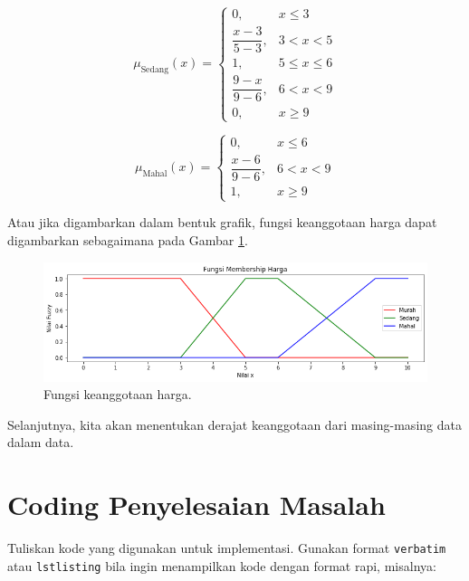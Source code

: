 \documentclass[12pt,a4paper]{article}
\theoremstyle{remark}
\begin{document}
\[
    \mu_{\text{Sedang}}(x) =
    \begin{cases}
        0,                    & x \leq 3        \\
        \dfrac{x - 3}{5 - 3}, & 3 < x < 5       \\
        1,                    & 5 \leq x \leq 6 \\
        \dfrac{9 - x}{9 - 6}, & 6 < x < 9       \\
        0,                    & x \geq 9
    \end{cases}
\]

\[
    \mu_{\text{Mahal}}(x) =
    \begin{cases}
        0,                    & x \leq 6  \\
        \dfrac{x - 6}{9 - 6}, & 6 < x < 9 \\
        1,                    & x \geq 9
    \end{cases}
\]

Atau jika digambarkan dalam bentuk grafik, fungsi keanggotaan harga dapat digambarkan sebagaimana pada Gambar \ref{fig:member_harga}.
\begin{figure}[H]
    \centering
    \includegraphics[width=1\linewidth]{images/member_harga.png}
    \caption{Fungsi keanggotaan harga.}
    \label{fig:member_harga}
\end{figure}

Selanjutnya, kita akan menentukan derajat keanggotaan dari masing-masing data dalam data.





\section{Coding Penyelesaian Masalah}
Tuliskan kode yang digunakan untuk implementasi.
Gunakan format \texttt{verbatim} atau \texttt{lstlisting} bila ingin menampilkan kode dengan format rapi, misalnya:
\end{document}
